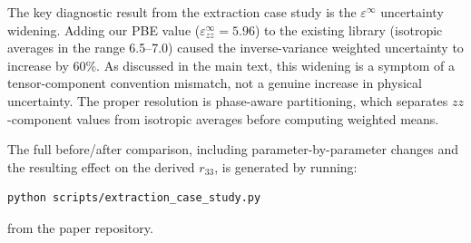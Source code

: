 \documentclass[onecolumn,superscriptaddress,amsmath,amssymb,longbibliography]{revtex4-2}
\begin{document}
The key diagnostic result from the extraction case study is the
$\varepsilon^\infty$ uncertainty widening. Adding our PBE value
($\varepsilon^\infty_{zz} = 5.96$) to the existing library (isotropic
averages in the range 6.5--7.0) caused the inverse-variance weighted
uncertainty to increase by 60\%. As discussed in the main text, this
widening is a symptom of a tensor-component convention mismatch, not a
genuine increase in physical uncertainty. The proper resolution is
phase-aware partitioning, which separates $zz$-component values from
isotropic averages before computing weighted means.

The full before/after comparison, including parameter-by-parameter
changes and the resulting effect on the derived $r_{33}$, is generated
by running:

\begin{verbatim}
python scripts/extraction_case_study.py
\end{verbatim}

from the paper repository.



\end{document}
